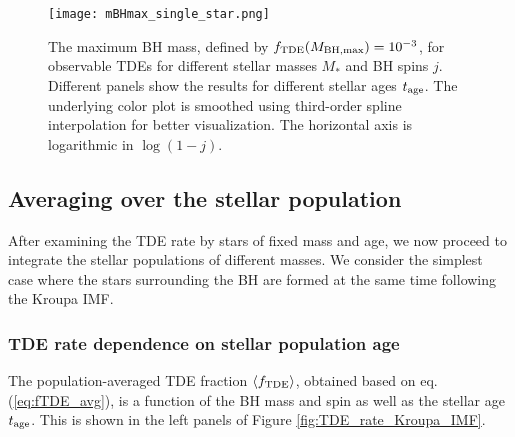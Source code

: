\documentclass[useAMS,usenatbib]{mn2e}
\def\mBHmax{M_{\rm BH,\max}}
\def\fTDE{f_{\rm TDE}}
\def\tage{t_{\rm age}}
\newcommand{\lara}[1]{\left\langle{#1}\right\rangle}
\begin{document}
\begin{figure*}
    \centering
    \texttt{[image: mBHmax\_single\_star.png]}
    \caption{
    The maximum BH mass, defined by $\fTDE(\mBHmax) = 10^{-3}$, for observable TDEs for different stellar masses $M_*$ and BH spins $j$.
    Different panels show the results for different stellar ages $\tage$.
    The underlying color plot is smoothed using third-order spline interpolation for better visualization. The horizontal axis is logarithmic in $\log(1-j)$.
    }
    \label{fig:mBHmax_single_star}
\end{figure*}


\subsection{Averaging over the stellar population}\label{sec:TDE_rate_KroupaIMF}
After examining the TDE rate by stars of fixed mass and age, we now proceed to integrate the stellar populations of different masses.
We consider the simplest case where the stars surrounding the BH are formed at the same time following the Kroupa IMF.

\subsubsection{TDE rate dependence on stellar population age}\label{sec:TDE_rate_dependence_on_age}

The population-averaged TDE fraction $\lara{\fTDE}$, obtained based on eq. (\ref{eq:fTDE_avg}), is a function of the BH mass and spin as well as the stellar age $\tage$. This is shown in the left panels of Figure \ref{fig:TDE_rate_Kroupa_IMF}. 
\end{document}
